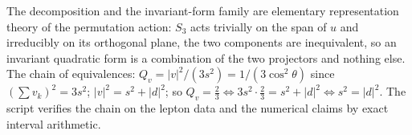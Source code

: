 The decomposition and the invariant-form family are elementary representation theory of the permutation action: $S_{3}$ acts trivially on the span of $u$ and irreducibly on its orthogonal plane, the two components are inequivalent, so an invariant quadratic form is a combination of the two projectors and nothing else. The chain of equivalences: $Q_{v} = |v|^{2}/(3s^{2}) = 1/(3\cos^{2}\theta)$ since $(\sum v_{k})^{2} = 3s^{2}$; $|v|^{2} = s^{2} + |d|^{2}$; so $Q_{v} = \tfrac23 \iff 3s^{2} \cdot \tfrac23 = s^{2} + |d|^{2} \iff s^{2} = |d|^{2}$. The script verifies the chain on the lepton data and the numerical claims by exact interval arithmetic.
